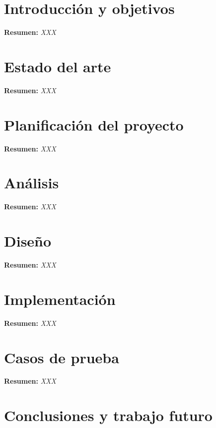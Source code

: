 \documentclass[12pt,a4paper, twoside]{report}
\begin{document}
	\chapter{Introducción y objetivos} \label{introductionChapter}
	
	
	\textbf{Resumen:} \textit{XXX}
		
	\chapter{Estado del arte} \label{stateArtChapter}
	\textbf{Resumen:} \textit{XXX}
	
	\chapter{Planificación del proyecto} \label{planningChapter}
	\textbf{Resumen:} \textit{XXX}
		
	\chapter{Análisis} \label{analysisChapter}
	
	\textbf{Resumen:} \textit{XXX}
	
	\chapter{Diseño} \label{designChapter}
	
	\textbf{Resumen:} \textit{XXX}
	
	\chapter{Implementación} \label{implementationChapter}
	
	\textbf{Resumen:} \textit{XXX}
	
	\chapter{Casos de prueba} \label{testingChapter}
	
	\textbf{Resumen:} \textit{XXX}

	\chapter*{Conclusiones y trabajo futuro} \label{conclusions}
	
\end{document}
